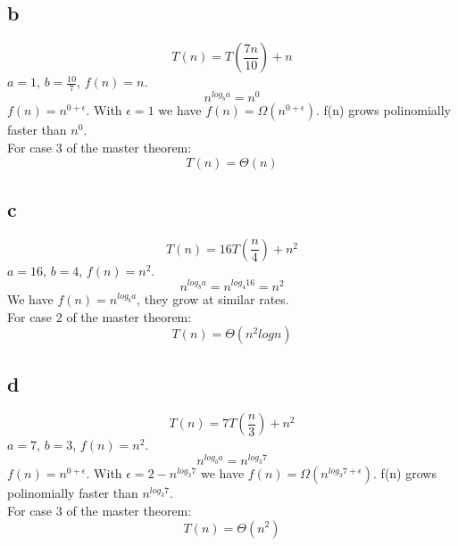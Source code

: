 \subsection*{b}
\begin{equation*}
	T(n) = T(\frac{7n}{10}) + n
\end{equation*}
$a = 1$, $b = \frac{10}{7}$, $f(n) = n$.
\begin{equation*}
	n^{log_ba} = n^0
\end{equation*}
$ f(n) = n^{0 + \epsilon}$. With $\epsilon = 1$ we have $f(n) = \Omega(n^{0 + \epsilon})$. f(n) grows polinomially faster than $n^0$.\\
For case 3 of the master theorem:
\begin{equation*}
	T(n) = \Theta(n)
\end{equation*}

\subsection*{c}
\begin{equation*}
	T(n) =16T(\frac{n}{4}) + n^2
\end{equation*}
$a = 16$, $b = 4$, $f(n) = n^2$.
\begin{equation*}
	n^{log_ba} = n^{log_{4}16} = n^2
\end{equation*}
We have $f(n) = n^{log_ba}$, they grow at similar rates.\\
For case 2 of the master theorem:
\begin{equation*}
	T(n) = \Theta(n^2logn)
\end{equation*}

\subsection*{d}
\begin{equation*}
	T(n) = 7T(\frac{n}{3}) + n^2
\end{equation*}
$a = 7$, $b = 3$, $f(n) = n^2$.
\begin{equation*}
	n^{log_ba} = n^{log_{3}7}
\end{equation*}
$ f(n) = n^{0 + \epsilon}$. With $\epsilon = 2 -  n^{log_{3}7} $ we have $f(n) = \Omega(n^{log_{3}7 + \epsilon})$. f(n) grows polinomially faster than $n^{log_{3}7}$.\\
For case 3 of the master theorem:
\begin{equation*}
	T(n) = \Theta(n^2)
\end{equation*}